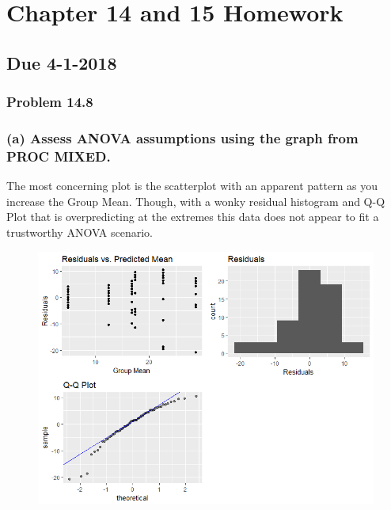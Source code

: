 \documentclass{article}
\begin{document}
\section*{Chapter 14 and 15 Homework}
\subsection*{Due 4-1-2018}
\subsubsection*{Problem 14.8}
\subsubsection*{ (a) Assess ANOVA assumptions using the graph from PROC MIXED.}
The most concerning plot is the scatterplot with an apparent pattern as you increase the Group Mean.  Though, with a wonky residual histogram and Q-Q Plot that is overpredicting at the extremes this data does not appear to fit a trustworthy ANOVA scenario.  
\begin{figure}[h]
\centering
\includegraphics[width = 1.0\textwidth]{ANOVAcheck148.png}
\end{figure}
\pagebreak
\end{document}
